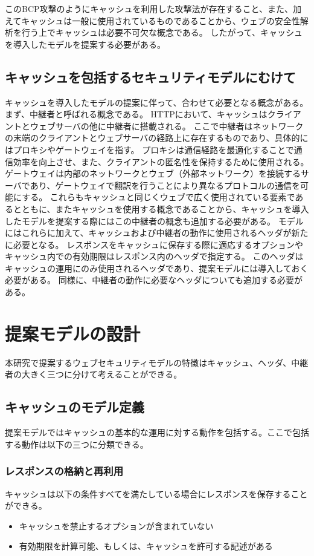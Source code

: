 \documentclass{css}
\begin{document}
このBCP攻撃のようにキャッシュを利用した攻撃法が存在すること、また、加えてキャッシュは一般に使用されているものであることから、ウェブの安全性解析を行う上でキャッシュは必要不可欠な概念である。
したがって、キャッシュを導入したモデルを提案する必要がある。

\subsection{キャッシュを包括するセキュリティモデルにむけて}
キャッシュを導入したモデルの提案に伴って、合わせて必要となる概念がある。
まず、中継者と呼ばれる概念である。
HTTPにおいて、キャッシュはクライアントとウェブサーバの他に中継者に搭載される。
ここで中継者はネットワークの末端のクライアントとウェブサーバの経路上に存在するものであり、具体的にはプロキシやゲートウェイを指す。
プロキシは通信経路を最適化することで通信効率を向上させ、また、クライアントの匿名性を保持するために使用される。
ゲートウェイは内部のネットワークとウェブ（外部ネットワーク）を接続するサーバであり、ゲートウェイで翻訳を行うことにより異なるプロトコルの通信を可能にする。
これらもキャッシュと同じくウェブで広く使用されている要素であるとともに、またキャッシュを使用する概念であることから、キャッシュを導入したモデルを提案する際にはこの中継者の概念も追加する必要がある。
モデルにはこれらに加えて、キャッシュおよび中継者の動作に使用されるヘッダが新たに必要となる。
レスポンスをキャッシュに保存する際に適応するオプションやキャッシュ内での有効期限はレスポンス内のヘッダで指定する。
このヘッダはキャッシュの運用にのみ使用されるヘッダであり、提案モデルには導入しておく必要がある。
同様に、中継者の動作に必要なヘッダについても追加する必要がある。

\section{提案モデルの設計}
\label{sec:proposed}
本研究で提案するウェブセキュリティモデルの特徴はキャッシュ、ヘッダ、中継者の大きく三つに分けて考えることができる。

\subsection{キャッシュのモデル定義}
\label{cache}
提案モデルではキャッシュの基本的な運用に対する動作を包括する。ここで包括する動作は以下の三つに分類できる。

\subsubsection{レスポンスの格納と再利用}
\label{sec:store_reuse}
キャッシュは以下の条件すべてを満たしている場合にレスポンスを保存することができる。
\begin{itemize}
\item キャッシュを禁止するオプションが含まれていない
\item 有効期限を計算可能、もしくは、キャッシュを許可する記述がある
\end{itemize}
\end{document}
